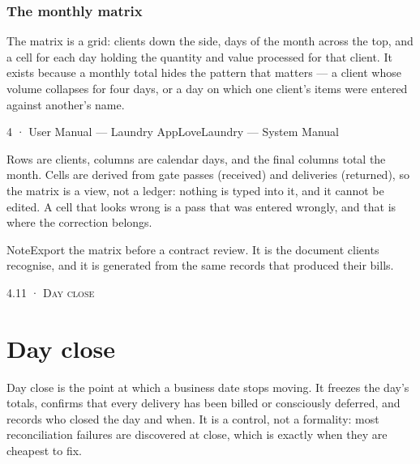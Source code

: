 \documentclass[11pt,a4paper,oneside]{book}
\begin{document}
\subsubsection*{The monthly matrix}
The matrix is a grid: clients down the side, days of the month across the top, and a cell for each day holding the quantity and value processed for that client. It exists because a monthly total hides the pattern that matters — a client whose volume collapses for four days, or a day on which one client's items were entered against another's name.

4 · User Manual — Laundry AppLoveLaundry — System Manual

Rows are clients, columns are calendar days, and the final columns total the month. Cells are derived from gate passes (received) and deliveries (returned), so the matrix is a view, not a ledger: nothing is typed into it, and it cannot be edited. A cell that looks wrong is a pass that was entered wrongly, and that is where the correction belongs.

\begin{notebox}NoteExport the matrix before a contract review. It is the document clients recognise, and it is generated from the same records that produced their bills.\end{notebox}
\textsc{\small\color{crimson}4.11 · Day close}\par\medskip
\section*{Day close}
Day close is the point at which a business date stops moving. It freezes the day's totals, confirms that every delivery has been billed or consciously deferred, and records who closed the day and when. It is a control, not a formality: most reconciliation failures are discovered at close, which is exactly when they are cheapest to fix.
\end{document}

